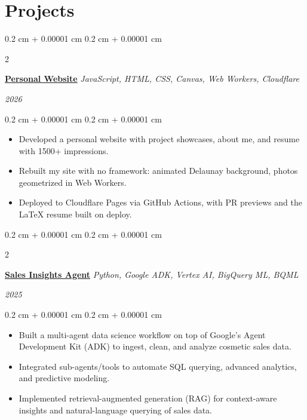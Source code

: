 \documentclass[10pt, letterpaper]{article}
\newenvironment{highlights}{
    \begin{itemize}[
        topsep=0.10 cm,
        parsep=0.10 cm,
        partopsep=0pt,
        itemsep=0pt,
        leftmargin=0.4 cm + 10pt
    ]
}{
    \end{itemize}
} %
\newenvironment{onecolentry}{
    \begin{adjustwidth}{
        0.2 cm + 0.00001 cm
    }{
        0.2 cm + 0.00001 cm
    }
}{
    \end{adjustwidth}
} %
\newenvironment{twocolentry}[2][]{
    \onecolentry
    \def\secondColumn{#2}
    \setcolumnwidth{\fill, 4.5 cm}
    \begin{paracol}{2}
}{
    \switchcolumn \raggedleft \secondColumn
    \end{paracol}
    \endonecolentry
} %
\begin{document}
    
    \section{Projects}

    \vspace{0.2 cm}

        \begin{twocolentry}
    {
        \textit{2026}
    }
    {
        \textbf{\href{https://jeffreychen.work}{Personal Website} }\textbar{}
        \textit{JavaScript, HTML, CSS, Canvas, Web Workers, Cloudflare}
    }
\end{twocolentry}

        \vspace{0.10 cm}
        \begin{onecolentry}
            \begin{highlights}
                \item Developed a personal website with project showcases, about me, and resume with 1500+ impressions.
                \item Rebuilt my site with no framework: animated Delaunay background, photos geometrized in Web Workers.
                \item Deployed to Cloudflare Pages via GitHub Actions, with PR previews and the LaTeX resume built on deploy.
            \end{highlights}
        \end{onecolentry}

    \vspace{0.2 cm}

        \begin{twocolentry}
        {
            \textit{2025}
        }
        {
            \textbf{\href{https://github.com/wovensoul/sales-insights-agent}{Sales Insights Agent}} \textbar{}
            \textit{Python, Google ADK, Vertex AI, BigQuery ML, BQML}
        }
        \end{twocolentry}
        \vspace{0.1 cm}
        \begin{onecolentry}
            \begin{highlights}
                \item Built a multi-agent data science workflow on top of Google’s Agent Development Kit (ADK) to ingest, clean, and analyze cosmetic sales data.
                \item Integrated sub-agents/tools to automate SQL querying, advanced analytics, and predictive modeling.
                \item Implemented retrieval-augmented generation (RAG) for context-aware insights and natural-language querying of sales data.
            \end{highlights}
        \end{onecolentry}
\end{document}
